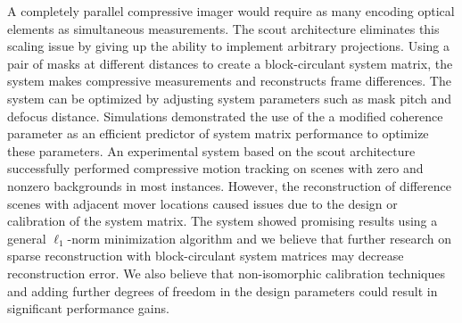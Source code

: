A completely parallel compressive imager would require as many encoding optical elements as simultaneous measurements. The \gls{scout} architecture eliminates this scaling issue by giving up the ability to implement arbitrary projections. Using a pair of masks at different distances to create a block-circulant system matrix, the system makes compressive measurements and reconstructs frame differences. The system can be optimized by adjusting system parameters such as mask pitch and defocus distance. Simulations demonstrated the use of the a modified coherence parameter as an efficient predictor of system matrix performance to optimize these parameters. An experimental system based on the \gls{scout} architecture successfully performed compressive motion tracking on scenes with zero and nonzero backgrounds in most instances. However, the reconstruction of difference scenes with adjacent mover locations caused issues due to the design or calibration of the system matrix. The system showed promising results using a general $\ell_1$-norm minimization algorithm and we believe that further research on sparse reconstruction with block-circulant system matrices may decrease reconstruction error. We also believe that non-isomorphic calibration techniques and adding further degrees of freedom in the design parameters could result in significant performance gains.




